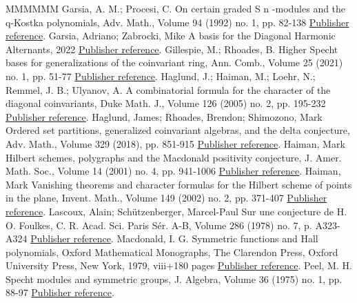 \documentclass[11pt]{article}
\theoremstyle{definition}
\numberwithin{equation}{section}
\begin{document}
\begin{thebibliography}{MMMMMM}
 Garsia, A. M.; Procesi, C. On certain graded S n -modules and the q-Kostka polynomials, Adv. Math., Volume 94 (1992) no. 1, pp. 82-138 \href{https://alco.centre-mersenne.org/articles/10.5802/alco.396/#GarsiaProcesi}{Publisher reference}.
 Garsia, Adriano; Zabrocki, Mike A basis for the Diagonal Harmonic Alternants, 2022 \href{https://alco.centre-mersenne.org/articles/10.5802/alco.396/#garsiaZabrocki}{Publisher reference}.
 Gillespie, M.; Rhoades, B. Higher Specht bases for generalizations of the coinvariant ring, Ann. Comb., Volume 25 (2021) no. 1, pp. 51-77 \href{https://alco.centre-mersenne.org/articles/10.5802/alco.396/#GillespieRhoades}{Publisher reference}.
 Haglund, J.; Haiman, M.; Loehr, N.; Remmel, J. B.; Ulyanov, A. A combinatorial formula for the character of the diagonal coinvariants, Duke Math. J., Volume 126 (2005) no. 2, pp. 195-232 \href{https://alco.centre-mersenne.org/articles/10.5802/alco.396/#HHLRU}{Publisher reference}.
 Haglund, James; Rhoades, Brendon; Shimozono, Mark Ordered set partitions, generalized coinvariant algebras, and the delta conjecture, Adv. Math., Volume 329 (2018), pp. 851-915 \href{https://alco.centre-mersenne.org/articles/10.5802/alco.396/#HRS}{Publisher reference}.
 Haiman, Mark Hilbert schemes, polygraphs and the Macdonald positivity conjecture, J. Amer. Math. Soc., Volume 14 (2001) no. 4, pp. 941-1006 \href{https://alco.centre-mersenne.org/articles/10.5802/alco.396/#HaimanGeometry}{Publisher reference}.
 Haiman, Mark Vanishing theorems and character formulas for the Hilbert scheme of points in the plane, Invent. Math., Volume 149 (2002) no. 2, pp. 371-407 \href{https://alco.centre-mersenne.org/articles/10.5802/alco.396/#HaimanDR}{Publisher reference}.
 Lascoux, Alain; Schützenberger, Marcel-Paul Sur une conjecture de H. O. Foulkes, C. R. Acad. Sci. Paris Sér. A-B, Volume 286 (1978) no. 7, p. A323-A324 \href{https://alco.centre-mersenne.org/articles/10.5802/alco.396/#LascouxSchutzenberger}{Publisher reference}.
 Macdonald, I. G. Symmetric functions and Hall polynomials, Oxford Mathematical Monographs, The Clarendon Press, Oxford University Press, New York, 1979, viii+180 pages \href{https://alco.centre-mersenne.org/articles/10.5802/alco.396/#Macdonald}{Publisher reference}.
 Peel, M. H. Specht modules and symmetric groups, J. Algebra, Volume 36 (1975) no. 1, pp. 88-97 \href{https://alco.centre-mersenne.org/articles/10.5802/alco.396/#Peel}{Publisher reference}.

\end{thebibliography}
\end{document}
